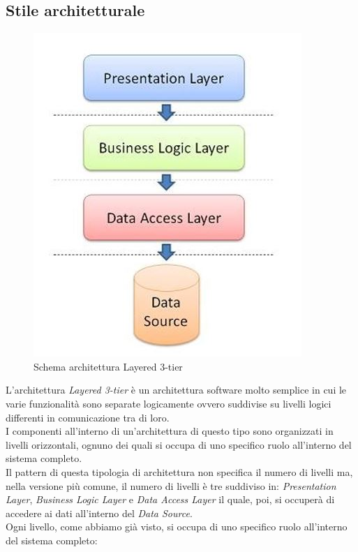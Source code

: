 \subsection{Stile architetturale}
\begin{figure}[h]
	\centering
	\includegraphics[scale=1]{immagini/layered_architecture}
	\caption{Schema architettura Layered 3-tier}
\end{figure}
L'architettura \textit{Layered 3-tier} è un architettura software molto semplice in cui le varie funzionalità sono separate logicamente ovvero suddivise su livelli logici differenti in comunicazione tra di loro.\\
I componenti all'interno di un'architettura di questo tipo sono organizzati in livelli orizzontali, ognuno dei quali si occupa di uno specifico ruolo all'interno del sistema completo.\\
Il pattern di questa tipologia di architettura non specifica il numero di livelli ma, nella versione più comune, il numero di livelli è tre suddiviso in: \textit{Presentation Layer}, \textit{Business Logic Layer} e \textit{Data Access Layer} il quale, poi, si occuperà di accedere ai dati all'interno del \textit{Data Source}.\\
Ogni livello, come abbiamo già visto, si occupa di uno specifico ruolo all'interno del sistema completo:
